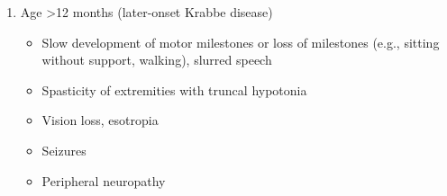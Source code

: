 \documentclass{scrartcl}
\begin{document}
\begin{enumerate}
\begin{enumerate}
\item Age >12 months (later-onset Krabbe disease)
\label{sec:orgc99fea7}

\begin{itemize}
\item Slow development of motor milestones or loss of milestones (e.g.,
sitting without support, walking), slurred speech
\item Spasticity of extremities with truncal hypotonia
\item Vision loss, esotropia
\item Seizures
\item Peripheral neuropathy
\end{itemize}
\end{enumerate}
\end{enumerate}
\end{document}
